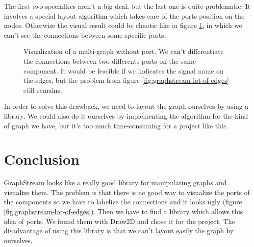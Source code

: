The first two specialties aren't a big deal, but the last one is quite
problematic. It involves a special layout algorithm which takes care of the ports
position on the nodes. Otherwise the visual result could be chaotic like in
figure \ref{fig:multigraph-no-port}, in which we can't see the connections
between some specific ports.

\begin{figure}[H]
  \centering
  \caption[Visualization of a multi-graph without port]{Visualization of a
    multi-graph without port. We can't differentiate the connections between two
  differents ports on the same component. It would be feasible if we indicates
  the signal name on the edges, but the problem from figure
  \ref{fig:graphstream-lot-of-edges} still remains.}
  \label{fig:multigraph-no-port}
\end{figure}

In order to solve this drawback, we need to layout the graph ourselves by using a
library. We could also do it ourselves by implementing the algorithm for the kind
of graph we have, but it's too much time-consuming for a project like this.

\section{Conclusion}
\label{sec:viewing-library-conclusion}

GraphStream looks like a really good library for manipulating graphs and visualize
them. The problem is that there is no good way to visualize the ports of the
components so we have to labelize the connections and it looks ugly (figure
\ref{fig:graphstream-lot-of-edges}). Then we have to find a library which allows
this idea of ports. We found them with Draw2D and chose it for the project. The
disadvantage of using this library is that we can't layout easily the graph by
ourselves.

